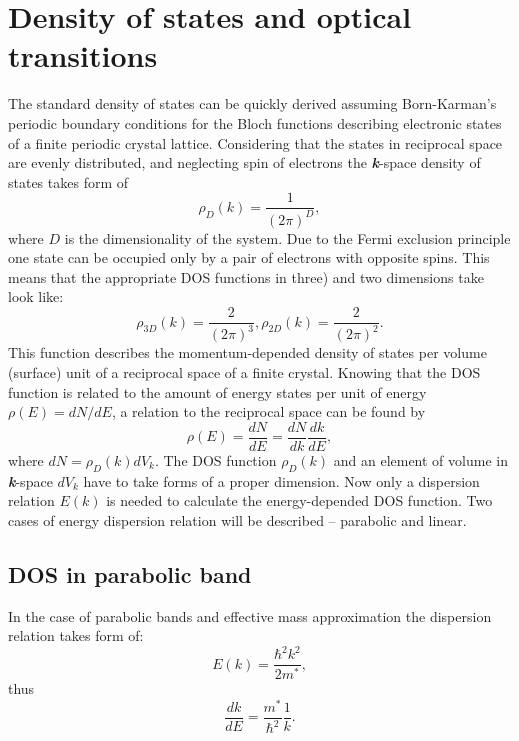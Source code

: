 \documentclass[titlepage,a4paper]{book}
\newcommand{\wciecie}{\quad\phantom{v}}
\begin{document}
\section{Density of states and optical transitions}
\label{section:DOS}
\wciecie
The standard density of states can be quickly derived assuming Born-Karman's periodic boundary conditions for the Bloch functions describing electronic states of a finite periodic crystal lattice. Considering that the states in reciprocal space are evenly distributed, and neglecting spin of electrons the \textbf{\textit{k}}-space density of states takes form of
\begin{equation}
\label{eq:DOS_k}
\rho_{D} (k) = \frac{1}{(2\pi)^{D}},
\end{equation}
where $D$ is the dimensionality of the system. Due to the Fermi exclusion principle one state can be occupied only by a pair of electrons with opposite spins. This means that the appropriate DOS functions in three) and two dimensions take look like:
\begin{equation}
\label{eq:DOS_2}
\rho_{3D} (k) = \frac{2}{(2\pi)^{3}}, \rho_{2D} (k) = \frac{2}{(2\pi)^{2}}.
\end{equation}
This function describes the momentum-depended density of states per volume (surface) unit of a reciprocal space of a finite crystal. Knowing that the DOS function is related to the amount of energy states per unit of energy $\rho (E) = dN/dE$, a relation to the reciprocal space can be found by
\begin{equation}
\label{eq:DOS_3}
\rho (E) = \frac{dN}{dE} = \frac{dN}{dk}\frac{dk}{dE},
\end{equation}
where $dN = \rho_D (k) dV_k$. The DOS function $\rho_D (k)$ and an element of volume in \textbf{\textit{k}}-space $dV_k$ have to take forms of a proper dimension. Now only a dispersion relation $E(k)$ is needed to calculate the energy-depended DOS function. Two cases of energy dispersion relation will be described -- parabolic and linear.
 
\subsection{DOS in parabolic band}
\wciecie
In the case of parabolic bands and effective mass approximation the dispersion relation takes form of:
\begin{equation}
\label{eq:DOS_4}
E(k) = \frac{\hbar^2k^2}{2m^*},
\end{equation}
thus
\begin{equation}
\label{eq:DOS_5}
\frac{dk}{dE} = \frac{m^*}{\hbar^2} \frac{1}{k}.
\end{equation}
\end{document}
